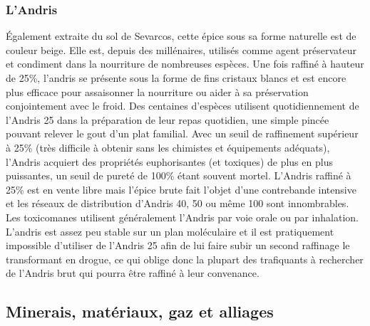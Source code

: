 \documentclass[twoside]{article}
\begin{document}
\subsubsection{L'Andris}
Également extraite du sol de Sevarcos, cette épice sous sa forme naturelle est de couleur beige. Elle est, depuis des millénaires, utilisés comme agent préservateur et condiment dans la nourriture de nombreuses espèces. Une fois raffiné à hauteur de 25\%, l'andris se présente sous la forme de fins cristaux blancs et est encore plus efficace pour assaisonner la nourriture ou aider à sa préservation conjointement avec le froid. Des centaines d'espèces utilisent quotidiennement de l'Andris 25  dans la préparation de leur repas quotidien, une simple pincée pouvant relever le gout d'un plat familial. Avec un seuil de raffinement supérieur à 25\% (très difficile à obtenir sans les chimistes et équipements adéquats), l'Andris acquiert des propriétés euphorisantes  (et toxiques) de plus en plus puissantes, un seuil de pureté de 100\% étant souvent mortel. L'Andris raffiné à 25\% est en vente libre mais l'épice brute fait l'objet d'une contrebande intensive et les réseaux de distribution d'Andris 40, 50 ou même 100 sont innombrables.\\

Les toxicomanes utilisent généralement l'Andris par voie orale ou par inhalation. L'andris est assez peu stable sur un plan moléculaire et il est pratiquement impossible d'utiliser de l'Andris 25 afin de lui faire subir un second raffinage le transformant en drogue, ce qui oblige donc la plupart des trafiquants à rechercher de l'Andris brut qui pourra être raffiné à leur convenance.


\subsection{Minerais, matériaux, gaz et alliages}
\end{document}
